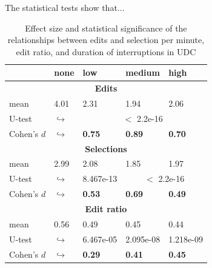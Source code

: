 \documentclass[times]{smrauth}
\begin{document}
The statistical tests show that...

\begin{table}[ht!]
\tiny
\renewcommand{\arraystretch}{1.3}
\caption{Effect size and statistical significance of the relationships between edits and selection per minute, edit ratio, and duration of interruptions in UDC} %
\label{tbl:p_value2}
\centering
\begin{tabular}{l | p{0.7cm} | p{1cm} | p{1cm} | p{1cm} } 
  & none & low & medium & high  \\  
  \hline
  \multicolumn{5}{c}{\textbf{Edits}} \\
  \hline
  mean & 4.01 &	2.31 & 1.94 & 2.06 \\ 
   \cline{3-5} 
  U-test & $\hookrightarrow$ & \multicolumn{3}{c}{$<$ 2.2e-16}  \\

  \cline{3-5} 
  Cohen's $d$ & $\hookrightarrow$	& \textbf{0.75} & \textbf{0.89} & \textbf{0.70}  \\
  \hline
  
  
  \multicolumn{5}{c}{\textbf{Selections}} \\
  \hline 
  mean & 2.99 &	2.08 & 1.85 & 1.97 \\ 
   \cline{3-5} 
  U-test & $\hookrightarrow$ & 8.467e-13 & \multicolumn{2}{c}{$<$ 2.2e-16}  \\
  
  \cline{3-5} 
  Cohen's $d$ & $\hookrightarrow$	& \textbf{0.53} & \textbf{0.69} & \textbf{0.49} \\  
  \hline
  \multicolumn{5}{c}{\textbf{Edit ratio}} \\
  \hline 
  mean & 0.56 & 0.49 & 0.45 & 0.44 \\ 
   \cline{3-5} 
  U-test & $\hookrightarrow$ & 6.467e-05 & 2.095e-08 & 1.218e-09 \\
  \cline{3-5} 
  Cohen's $d$ & $\hookrightarrow$ & \textbf{0.29} & \textbf{0.41} & \textbf{0.45}\\
\hline

\end{tabular}
\end{table}
\end{document}
